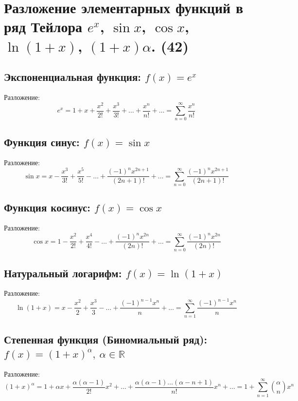 \documentclass[14pt]{extreport}
\begin{document}
    \chapter{Разложение элементарных функций в ряд Тейлора $e^x$, $\sin x$, $\cos x$, $\ln(1 + x)$, $(1 + x)\alpha$. (42)}

    \section{Экспоненциальная функция: $f(x) = e^x$}
    Разложение:$$e^x = 1 + x + \frac{x^2}{2!} + \frac{x^3}{3!} + \dots + \frac{x^n}{n!} + \dots = \sum_{n=0}^{\infty} \frac{x^n}{n!}$$

    \section{Функция синус: $f(x) = \sin x$}

    Разложение:$$\sin x = x - \frac{x^3}{3!} + \frac{x^5}{5!} - \dots + \frac{(-1)^n x^{2n+1}}{(2n+1)!} + \dots = \sum_{n=0}^{\infty} \frac{(-1)^n x^{2n+1}}{(2n+1)!}$$

    \section{Функция косинус: $f(x) = \cos x$}

    Разложение:$$\cos x = 1 - \frac{x^2}{2!} + \frac{x^4}{4!} - \dots + \frac{(-1)^n x^{2n}}{(2n)!} + \dots = \sum_{n=0}^{\infty} \frac{(-1)^n x^{2n}}{(2n)!}$$

    \section{Натуральный логарифм: $f(x) = \ln(1 + x)$}

    Разложение:$$\ln(1 + x) = x - \frac{x^2}{2} + \frac{x^3}{3} - \dots + \frac{(-1)^{n-1} x^n}{n} + \dots = \sum_{n=1}^{\infty} \frac{(-1)^{n-1} x^n}{n}$$


    \section{Степенная функция (Биномиальный ряд): $f(x) = (1 + x)^\alpha, \ \alpha \in \mathbb{R}$}

    Разложение:$$(1 + x)^\alpha = 1 + \alpha x + \frac{\alpha(\alpha-1)}{2!}x^2 + \dots + \frac{\alpha(\alpha-1)\dots(\alpha-n+1)}{n!}x^n + \dots = 1 + \sum_{n=1}^{\infty} \binom{\alpha}{n} x^n$$
\end{document}
